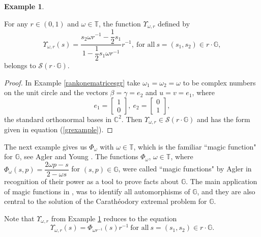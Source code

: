 \documentclass[12pt,reqno]{amsart}
\numberwithin{equation}{section}
\theoremstyle{definition}
\newtheorem{example}[equation]{Example}
\begin{document}
\begin{example}\label{example2} {\normalfont
    For any $r\in(0,1)$ and $\omega\in\mathbb{T}$, the function $\Upsilon_{\omega,r}$ defined by
\begin{equation}\label{grexample}
    \Upsilon_{\omega,r}(s)=\dfrac{s_{2}\omega r^{-1}-\dfrac{1}{2}s_{1}}{1-\dfrac{1}{2}s_{1}\omega r^{-1}}r^{-1}, \ \text{for all} \ 
    s=(s_{1},s_{2})\in r\cdot\mathbb{G},    
\end{equation}
belongs to $\mathcal{S}(r\cdot\mathbb{G})$. 
\begin{proof}
In Example \ref{rankonematricesgr} take $\omega_{1}=\omega_{2}=\omega$ to be complex numbers on the unit circle and the vectors $\beta=\gamma=e_{2}$ and $u=v=e_{1}$, where 
$$e_{1}=\begin{bmatrix}
    1 \\
    0
\end{bmatrix},~e_{2}=\begin{bmatrix}
    0 \\
    1
\end{bmatrix},$$ 
the standard orthonormal bases in $\mathbb{C}^{2}$.
Then $\Upsilon_{\omega,r}\in\mathcal{S}(r\cdot \mathbb{G})$ and has the form given in equation (\ref{grexample}). \end{proof}}
\end{example}


The next example gives us $\Phi_{\omega}$ with $\omega\in\mathbb{T}$, which  is the familiar ``magic function" for $\mathbb{G}$,  see Agler and Young \cite{HGSB}. The functions $\Phi_{\omega}$, $\omega\in\mathbb{T}$, where $\Phi_{\omega}(s,p)= \dfrac{2\omega p-s}{2-\omega s}$ for $(s,p)\in\mathbb{G}$, were called ``magic functions" by Agler in recognition of their power as a tool to prove facts about $\mathbb{G}$. The main application of magic functions in \cite{HGSB,ay2008}, was to identify all automorphisms of $\mathbb{G}$, and they are also central to the solution of the Carath\'{e}odory extremal problem for $\mathbb{G}$.

Note that $\Upsilon_{\omega,r}$ from Example \ref{example2} reduces to the equation 
\begin{equation}\label{Upsilon}
    \Upsilon_{\omega,r}(s)=\Phi_{\omega r^{-1}}(s)r^{-1} \ \text{for all} \    s=(s_{1},s_{2})\in r\cdot\mathbb{G}.    
\end{equation}
\end{document}
